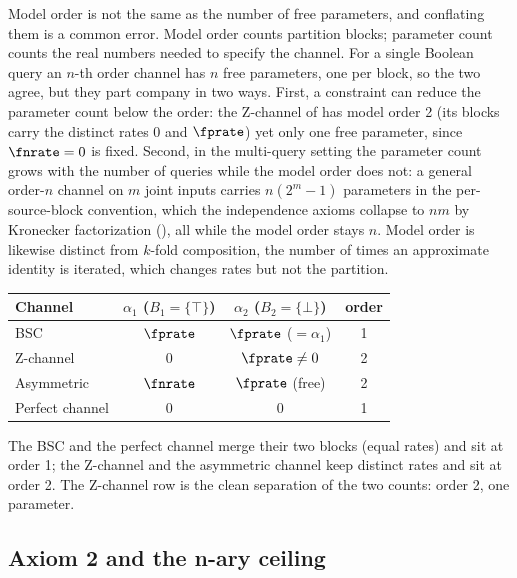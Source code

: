 Model order is not the same as the number of free
parameters, and conflating them is a
common error. Model order counts partition blocks; parameter count
counts the real numbers needed to specify the channel. For a single Boolean
query an $n$-th order channel has $n$ free parameters, one per block, so the two
agree, but they part company in two ways. First, a constraint can reduce the
parameter count below the order: the Z-channel of  has model
order 2 (its blocks carry the distinct rates $0$ and $\fprate$) yet only one
free parameter, since $\fnrate = 0$ is fixed. Second, in the multi-query setting
the parameter count grows with the number of queries while the model order does
not: a general order-$n$ channel on $m$ joint inputs carries $n(2^m - 1)$
parameters in the per-source-block convention, which the independence axioms
collapse to $nm$ by Kronecker factorization (),
all while the model order stays $n$. Model order is likewise distinct from
$k$-fold composition, the number
of times an approximate identity is iterated, which changes rates but not the
partition.

\begin{center}
\begin{tabular}{l|c|c|c}
  Channel & $\alpha_1$ ($B_1 = \{\top\}$) & $\alpha_2$ ($B_2 = \{\bot\}$) & order \\
  \hline
  BSC             & $\fprate$ & $\fprate$ ($= \alpha_1$) & 1 \\
  Z-channel       & $0$       & $\fprate \neq 0$          & 2 \\
  Asymmetric      & $\fnrate$ & $\fprate$ (free)          & 2 \\
  Perfect channel & $0$       & $0$                        & 1 \\
\end{tabular}
\end{center}

The BSC and the perfect channel merge their two blocks (equal rates) and sit at
order 1; the Z-channel and the asymmetric channel keep distinct rates and sit at
order 2. The Z-channel row is the clean separation of the two counts: order 2,
one parameter.

\subsection*{Axiom 2 and the n-ary ceiling}

